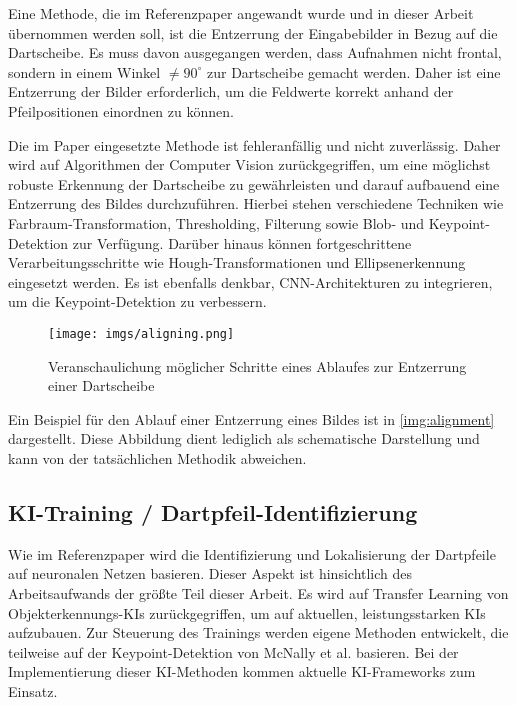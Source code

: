 Eine Methode, die im Referenzpaper angewandt wurde und in dieser Arbeit übernommen werden soll, ist die Entzerrung der Eingabebilder in Bezug auf die Dartscheibe. Es muss davon ausgegangen werden, dass Aufnahmen nicht frontal, sondern in einem Winkel $\neq90^\circ$ zur Dartscheibe gemacht werden. Daher ist eine Entzerrung der Bilder erforderlich, um die Feldwerte korrekt anhand der Pfeilpositionen einordnen zu können.

Die im Paper eingesetzte Methode ist fehleranfällig und nicht zuverlässig. Daher wird auf Algorithmen der Computer Vision zurückgegriffen, um eine möglichst robuste Erkennung der Dartscheibe zu gewährleisten und darauf aufbauend eine Entzerrung des Bildes durchzuführen. Hierbei stehen verschiedene Techniken wie Farbraum-Transformation, Thresholding, Filterung sowie Blob- und Keypoint-Detektion zur Verfügung. Darüber hinaus können fortgeschrittene Verarbeitungsschritte wie Hough-Transformationen und Ellipsenerkennung eingesetzt werden. Es ist ebenfalls denkbar, CNN-Architekturen zu integrieren, um die Keypoint-Detektion zu verbessern.

\begin{figure}
    \centering
    \texttt{[image: imgs/aligning.png]}
    \caption{Veranschaulichung möglicher Schritte eines Ablaufes zur Entzerrung einer Dartscheibe}
    \label{img:alignment}
\end{figure}

Ein Beispiel für den Ablauf einer Entzerrung eines Bildes ist in \autoref{img:alignment} dargestellt. Diese Abbildung dient lediglich als schematische Darstellung und kann von der tatsächlichen Methodik abweichen.

\subsection{KI-Training / Dartpfeil-Identifizierung}
\label{sec:methodik:ki}

Wie im Referenzpaper wird die Identifizierung und Lokalisierung der Dartpfeile auf neuronalen Netzen basieren. Dieser Aspekt ist hinsichtlich des Arbeitsaufwands der größte Teil dieser Arbeit. Es wird auf Transfer Learning von Objekterkennungs-KIs zurückgegriffen, um auf aktuellen, leistungsstarken KIs aufzubauen. Zur Steuerung des Trainings werden eigene Methoden entwickelt, die teilweise auf der Keypoint-Detektion von McNally et al. basieren. Bei der Implementierung dieser KI-Methoden kommen aktuelle KI-Frameworks zum Einsatz.

